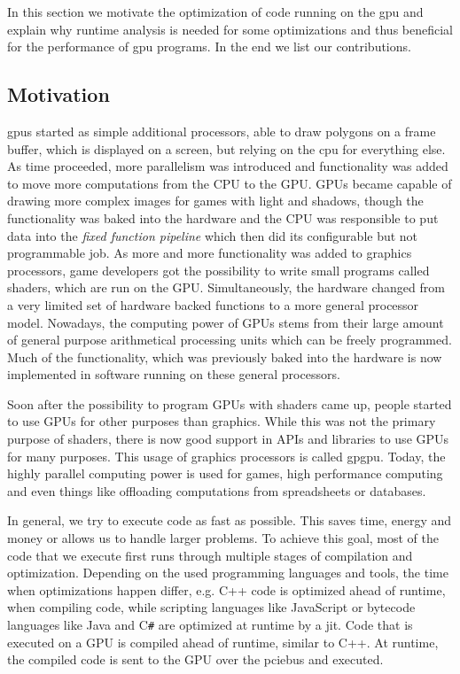 {}
In this section we motivate the optimization of code running on the \gls{gpu} and explain why runtime analysis is needed for some optimizations and thus beneficial for the performance of \gls{gpu} programs. In the end we list our contributions.

\subsection{Motivation}
\label{sub:motivation}
\Glspl{gpu} started as simple additional processors, able to draw polygons on a frame buffer, which is displayed on a screen, but relying on the \gls{cpu} for everything else. As time proceeded, more parallelism was introduced and functionality was added to move more computations from the CPU to the GPU. GPUs became capable of drawing more complex images for games with light and shadows, though the functionality was baked into the hardware and the CPU was responsible to put data into the \emph{fixed function pipeline} which then did its configurable but not programmable job.
As more and more functionality was added to graphics processors, game developers got the possibility to write small programs called shaders, which are run on the GPU. Simultaneously, the hardware changed from a very limited set of hardware backed functions to a more general processor model. Nowadays, the computing power of GPUs stems from their large amount of general purpose arithmetical processing units which can be freely programmed. Much of the functionality, which was previously baked into the hardware is now implemented in software running on these general processors.~\cite{McClanahan2010}

Soon after the possibility to program GPUs with shaders came up, people started to use GPUs for other purposes than graphics. While this was not the primary purpose of shaders, there is now good support in APIs and libraries to use GPUs for many purposes. This usage of graphics processors is called \gls{gpgpu}. Today, the highly parallel computing power is used for games, high performance computing and even things like offloading computations from spreadsheets or databases.~\cite{Lillqvist2016, Meraji2015}

In general, we try to execute code as fast as possible. This saves time, energy and money or allows us to handle larger problems. To achieve this goal, most of the code that we execute first runs through multiple stages of compilation and optimization. Depending on the used programming languages and tools, the time when optimizations happen differ, e.g. C++ code is optimized ahead of runtime, when compiling code, while scripting languages like JavaScript or bytecode languages like Java and C\texttt{\#} are optimized at runtime by a \gls{jit}. Code that is executed on a GPU is compiled ahead of runtime, similar to C++. At runtime, the compiled code is sent to the GPU over the \gls{pciebus} and executed.

